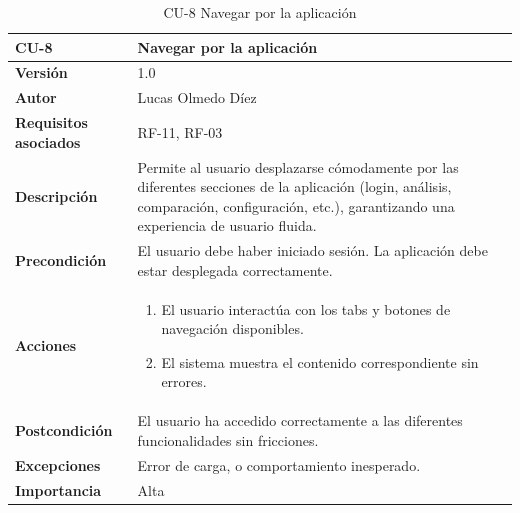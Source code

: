 \clearpage
\begin{table}[p]
    \centering
    \begin{tabularx}{\linewidth}{ p{} p{} }
        \toprule
        \textbf{CU-8} & Navegar por la aplicación \\
        \midrule
        \textbf{Versión} & 1.0 \\
        \textbf{Autor} & Lucas Olmedo Díez \\
        \textbf{Requisitos asociados} & RF-11, RF-03 \\
        \textbf{Descripción} & Permite al usuario desplazarse cómodamente por las diferentes secciones de la aplicación (login, análisis, comparación, configuración, etc.), garantizando una experiencia de usuario fluida. \\
        \textbf{Precondición} & El usuario debe haber iniciado sesión. La aplicación debe estar desplegada correctamente. \\
        \textbf{Acciones} &
        \begin{enumerate}
            \def\labelenumi{\arabic{enumi}.}
            \tightlist
            \item El usuario interactúa con los tabs y botones de navegación disponibles.
            \item El sistema muestra el contenido correspondiente sin errores.
        \end{enumerate}\\
        \textbf{Postcondición} & El usuario ha accedido correctamente a las diferentes funcionalidades sin fricciones. \\
        \textbf{Excepciones} & Error de carga, o comportamiento inesperado. \\
        \textbf{Importancia} & Alta \\
        \bottomrule
    \end{tabularx}
    \caption{CU-8 Navegar por la aplicación}
\end{table}